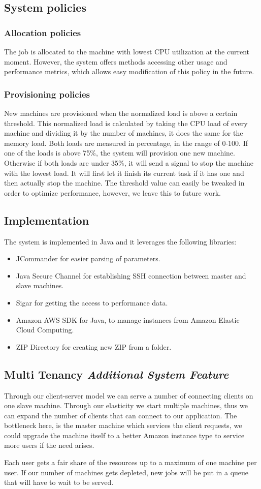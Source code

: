 \subsection{System policies}
\subsubsection{Allocation policies}
The job is allocated to the machine with lowest CPU utilization at the current moment. However, the system offers methods accessing other usage and performance metrics, which allows easy modification of this policy in the future.
\subsubsection{Provisioning policies}
New machines are provisioned when the normalized load is above a certain threshold. This normalized load is calculated by taking the CPU load of every machine and dividing it by the number of machines, it does the same for the memory load. Both loads are measured in percentage, in the range of 0-100. If one of the loads is above 75\%, the system will provision one new machine. Otherwise if both loads are under 35\%, it will send a signal to stop the machine with the lowest load. It will first let it finish its current task if it has one and then actually stop the machine. The threshold value can easily be tweaked in order to optimize performance, however, we leave this to future work.
\subsection{Implementation}
The system is implemented in Java and it leverages the following libraries:
\begin{itemize}
 \item JCommander\cite{jcommander} for easier parsing of parameters.
 \item Java Secure Channel\cite{jsch} for establishing SSH connection between master and slave machines.
 \item Sigar\cite{sigar} for getting the access to performance data.
 \item Amazon AWS SDK for Java\cite{aws}, to manage instances from Amazon Elastic Cloud Computing.
 \item ZIP Directory\cite{zip} for creating new ZIP from a folder.
\end{itemize}

\subsection{Multi Tenancy \emph{Additional System Feature}}
Through our client-server model we can serve a number of connecting clients on one slave machine. Through our elasticity we start multiple machines, thus we can expand the number of clients that can connect to our application. The bottleneck here, is the master machine which services the client requests, we could upgrade the machine itself to a better Amazon instance type to service more users if the need arises. 

Each user gets a fair share of the resources up to a maximum of one machine per user. If our number of machines gets depleted, new jobs will be put in a queue that will have to wait to be served. 